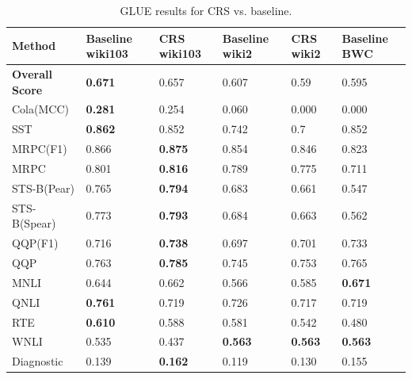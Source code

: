 \begin{table}[]
\begin{tabular}{|l|l|l|l|l|l|}
\hline
Method     & Baseline wiki103& CRS wiki103 & Baseline wiki2 & CRS wiki2 & Baseline BWC               \\ \hline \hline
\textbf{Overall Score}        & \textbf{0.671}        & 0.657        & 0.607      & 0.59       & 0.595                      \\ \hline
Cola(MCC)    & \textbf{0.281}        & 0.254        & 0.060       & 0.000          & 0.000                          \\ \hline
SST          & \textbf{0.862}        & 0.852        & 0.742      & 0.7        & 0.852                      \\ \hline
MRPC(F1)     & 0.866        & \textbf{0.875}        & 0.854      & 0.846      & 0.823                      \\ \hline
MRPC         & 0.801        & \textbf{0.816}        & 0.789      & 0.775      & 0.711                      \\ \hline
STS-B(Pear)  & 0.765        & \textbf{0.794}        & 0.683      & 0.661      & 0.547                      \\ \hline
STS-B(Spear) & 0.773        & \textbf{0.793}        & 0.684      & 0.663      & 0.562                      \\ \hline
QQP(F1)      & 0.716        & \textbf{0.738}        & 0.697      & 0.701      & 0.733                      \\ \hline
QQP          & 0.763        & \textbf{0.785}        & 0.745      & 0.753      & 0.765                      \\ \hline
MNLI         & 0.644        & 0.662        & 0.566      & 0.585      & \textbf{0.671}                      \\ \hline
QNLI         & \textbf{0.761}        & 0.719        & 0.726      & 0.717      & 0.719                      \\ \hline
RTE          & \textbf{0.610}         & 0.588        & 0.581      & 0.542      & 0.480                       \\ \hline
WNLI         & 0.535        & 0.437        & \textbf{0.563}      & \textbf{0.563}      & \textbf{0.563}                      \\ \hline
Diagnostic   & 0.139        & \textbf{0.162}        & 0.119      & 0.130       & 0.155 \\ \hline
\end{tabular}
\caption{GLUE results for CRS vs. baseline.}
\label{table:glue-corpus}
\end{table}
